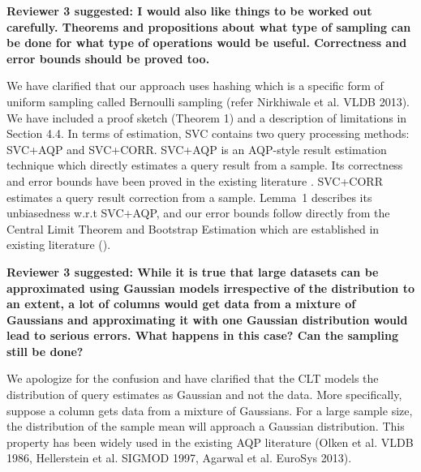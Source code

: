 \vspace{1.5em}

\textbf{Reviewer 3 suggested: I would also like things to be worked out carefully. Theorems and propositions about what type of sampling can be done for what type of operations would be useful. Correctness and error bounds should be proved too.}

We have clarified that our approach uses hashing which is a specific form of uniform sampling called Bernoulli sampling (refer Nirkhiwale et al. VLDB 2013). We have included a proof sketch (Theorem 1) and a description of limitations in Section 4.4. In terms of estimation, SVC contains two query processing methods:  SVC+AQP and SVC+CORR. SVC+AQP is an AQP-style result estimation technique which directly estimates a query result from a sample. Its correctness and error bounds have been proved in the existing literature \cite{AgarwalMPMMS13,agarwalknowing}. SVC+CORR estimates a query result correction from a sample. Lemma~1 describes its unbiasedness w.r.t SVC+AQP, and our error bounds follow directly from the Central Limit Theorem and Bootstrap Estimation which are established in existing literature (\cite{agarwalknowing}).

\vspace{1.5em}

\textbf{Reviewer 3 suggested: While it is true that large datasets can be approximated using Gaussian models irrespective of the distribution to an extent, a lot of columns would get data from a mixture of Gaussians and approximating it with one Gaussian distribution would lead to serious errors. What happens in this case? Can the sampling still be done?}

We apologize for the confusion and have clarified that the CLT models the distribution of query estimates as Gaussian and not the data. More specifically, suppose a column gets data from a mixture of Gaussians. For a large sample size, the distribution of the sample mean will approach a Gaussian distribution. This property has been widely used in the existing AQP literature (Olken et al. VLDB 1986, Hellerstein et al. SIGMOD 1997, Agarwal et al. EuroSys 2013). 

